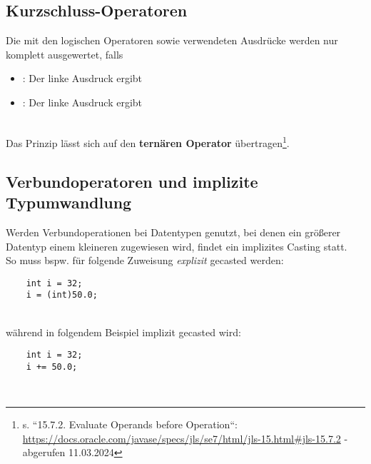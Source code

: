 \subsection{Kurzschluss-Operatoren}
Die mit den logischen Operatoren \code{&&} sowie \code{||} verwendeten Ausdrücke werden nur komplett ausgewertet, falls

\begin{itemize}
    \item \code{&&}: Der linke Ausdruck  ergibt
    \item \code{||}: Der linke Ausdruck  ergibt
\end{itemize}\\

\noindent
Das Prinzip lässt sich auf den \textbf{ternären Operator}  übertragen\footnote{
s. ``15.7.2. Evaluate Operands before Operation``: \url{https://docs.oracle.com/javase/specs/jls/se7/html/jls-15.html#jls-15.7.2} - abgerufen 11.03.2024
}.


\subsection{Verbundoperatoren und implizite Typumwandlung}

Werden Verbundoperationen bei Datentypen genutzt, bei denen ein größerer Datentyp einem kleineren zugewiesen wird, findet ein implizites Casting statt.\\

\noindent
So muss bspw. für folgende Zuweisung \textit{explizit} gecasted werden:

\begin{verbatim}
    int i = 32;
    i = (int)50.0;
\end{verbatim}\\

während in folgendem Beispiel implizit gecasted wird:

\begin{verbatim}
    int i = 32;
    i += 50.0;
\end{verbatim}\\
